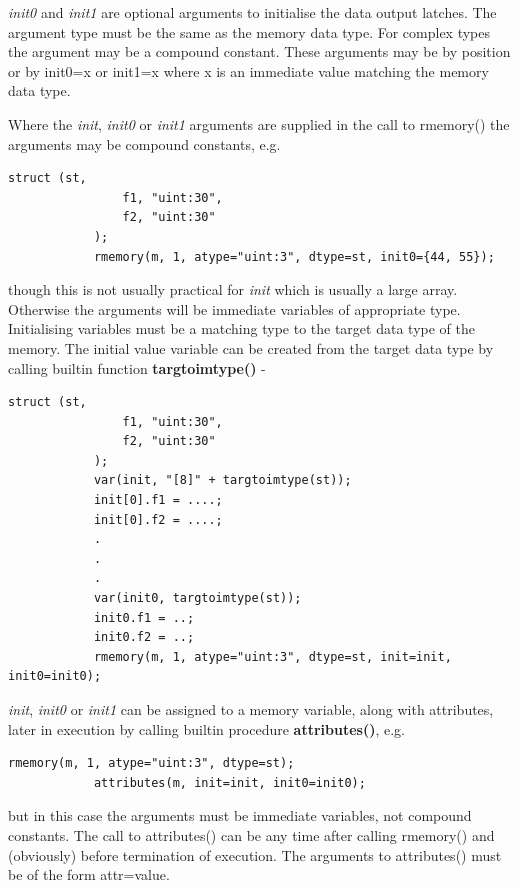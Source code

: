         {\em init0} and {\em init1} are optional arguments to initialise the data
        output latches. The argument type must be the same as the memory data
        type. For complex types the argument may be a compound constant. These
        arguments may be by position or by init0=x or init1=x where x is an
        immediate value matching the memory data type.
        
        Where the {\em init}, {\em init0} or {\em init1} arguments are supplied
        in the call to rmemory() the arguments may be compound constants, e.g.
        \begin{lstlisting}[gobble=8, language=threepl]
            struct (st,
                f1, "uint:30",
                f2, "uint:30"
            );
            rmemory(m, 1, atype="uint:3", dtype=st, init0={44, 55});
        \end{lstlisting}
        though this is not usually practical for {\em init} which is usually
        a large array. Otherwise the arguments will be immediate variables
        of appropriate type. Initialising variables must be a matching type
        to the target data type of the memory. The initial value variable
        can be created from the target data type by calling builtin
        function {\bf targtoimtype()}  -

        \begin{lstlisting}[gobble=8, language=threepl]
            struct (st,
                f1, "uint:30",
                f2, "uint:30"
            );
            var(init, "[8]" + targtoimtype(st));
            init[0].f1 = ....;
            init[0].f2 = ....;
            .
            .
            .
            var(init0, targtoimtype(st));
            init0.f1 = ..;
            init0.f2 = ..;
            rmemory(m, 1, atype="uint:3", dtype=st, init=init, init0=init0);
        \end{lstlisting}
            
        {\em init}, {\em init0} or {\em init1} can be assigned to a memory
        variable, along with attributes, later in execution by calling
        builtin procedure {\bf attributes()}, e.g.
        \begin{lstlisting}[gobble=8, language=threepl]
            rmemory(m, 1, atype="uint:3", dtype=st);
            attributes(m, init=init, init0=init0);
        \end{lstlisting}
        but in this case the arguments must be immediate variables, not compound
        constants. The call to attributes() can be any time after calling
        rmemory() and (obviously) before termination of execution.
        The arguments to attributes() must be of the form attr=value.
        
